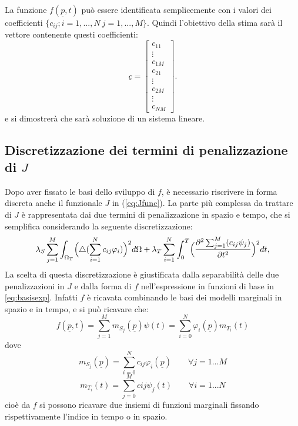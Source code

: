 \documentclass[a4paper,11pt,twoside,openright]{book}							%
\begin{document}
La funzione $f(\underline p,t)$ può essere identificata semplicemente con i valori dei coefficienti $\{c_{ij}; i=1, ... , N\ j=1, ... , M\}$. Quindi l'obiettivo della stima sarà il vettore contenente questi coefficienti:
\begin{equation}
\underline c =
\begin{bmatrix}
c_{11}  \\
\vdots\\
c_{1M}  \\
c_{21}  \\
\vdots\\
c_{2M}  \\
\vdots\\
c_{NM}
\end{bmatrix}.
\end{equation}
e si dimostrerà che sarà soluzione di un sistema lineare.

\subsection*{Discretizzazione dei termini di penalizzazione di $J$}
Dopo aver fissato le basi dello sviluppo di $f$, è necessario riscrivere in forma discreta anche il funzionale $J$ in (\ref{eq:Jfunc}). La parte più complessa da trattare di $J$ è rappresentata dai due termini di penalizzazione in spazio e tempo, che si semplifica considerando la seguente discretizzazione:
\begin{equation}
\label{eq:penalizzdisc}
\lambda_S  \sum_{j=1}^M \int_{\Omega_T} \Bigl( \triangle(\sum_{i=1}^N  c_{ij}\varphi_i ) \Bigr)^2 d \Omega + \lambda_T \sum_{i=1}^N\int_0^T \Bigl( \frac{\partial^2 \sum_{j=1}^M(c_{ij}\psi_j) }{\partial t ^2} \Bigr)^2 dt ,
\end{equation}
La scelta di questa discretizzazione è giustificata dalla separabilità delle due penalizzazioni in $J$ e dalla forma di $f$ nell'espressione in funzioni di base in \ref{eq:basisexp}. Infatti $f$ è ricavata combinando le basi dei modelli marginali in spazio e in tempo, e si può ricavare che:
$$
f(\underline p,t)=\sum_{j=1}^Mm_{S_j}(\underline p)\psi(t)=\sum_{i=0}^N\varphi_i(\underline p)m_{T_i}(t)
$$
dove
$$
m_{S_j}(\underline p)=\sum_{i=0}^Nc_{ij}\varphi_i(\underline p) \qquad \forall j=1...M
$$
$$
m_{T_i}(t)=\sum_{j=0}^Mc{ij}\psi_j(t) \qquad \forall i=1...N
$$
cioè da $f$ si possono ricavare due insiemi di funzioni marginali fissando rispettivamente l'indice in tempo o in spazio.
\end{document}
